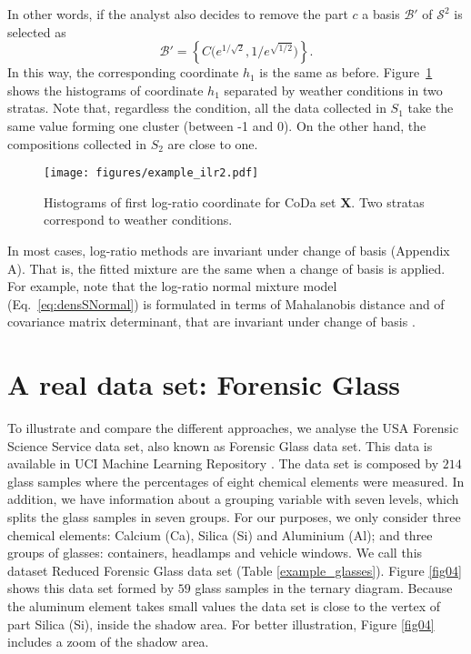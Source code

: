 \documentclass[12pt, a4paper]{article}
\begin{document}
In other words, if the analyst also decides to remove the part $c$ a basis $\mathcal{B}'$ of $\mathcal{S}^2$ is selected as
\begin{equation}
\mathcal{B}' = \left\{ C\Big( e^{1/\sqrt{2}}, 1/e^{\sqrt{1/2}} \Big) \right\}.
\end{equation}
In this way, the corresponding coordinate $h_1$ is the same as before. Figure~\ref{example_ilr2} 
shows the histograms of coordinate $h_1$ separated by weather conditions in two stratas. Note that, regardless the condition, all the data collected in $S_1$ take the same value forming one cluster (between -1 and 0). On the other hand, the compositions collected in $S_2$ are close to one.

\begin{figure}[thbp]
\centering
\texttt{[image: figures/example\_ilr2.pdf]}
\caption{Histograms of first log-ratio coordinate for CoDa set $\mathbf{X}$. Two stratas correspond to weather conditions.}\label{example_ilr2}
\end{figure}
% 


In most cases, log-ratio methods are invariant under change of basis (Appendix A). That is, the fitted mixture are the same when a change of basis is applied. For example, note that the log-ratio normal mixture model  (Eq.~\ref{eq:densSNormal}) is formulated in terms of Mahalanobis distance and of covariance matrix determinant, that are invariant under change of basis  \citep{barcelo1999comment}.

\section{A real data set: Forensic Glass}
\label{example_section}

\noindent To illustrate and compare the different approaches, we analyse the USA Forensic Science Service data set, also known as Forensic Glass data set. This data is available in UCI Machine Learning Repository \citep{uci2007repository}.  The data set is composed by  $214$ glass samples where the percentages of eight chemical elements were measured. In addition, we have information about a grouping variable with seven levels, which splits the glass samples in seven groups. For our purposes, we only consider three chemical elements: Calcium (Ca), Silica (Si) and Aluminium (Al); and three groups of glasses: containers, headlamps and vehicle windows. We call this dataset Reduced Forensic Glass data set (Table \ref{example_glasses}). Figure \ref{fig04} shows this data set formed by $59$ glass samples in the ternary diagram. Because the aluminum element takes small values the data set is close to the vertex of part Silica (Si), inside the shadow area. For better illustration, Figure \ref{fig04} includes a zoom of the shadow area.
\end{document}

